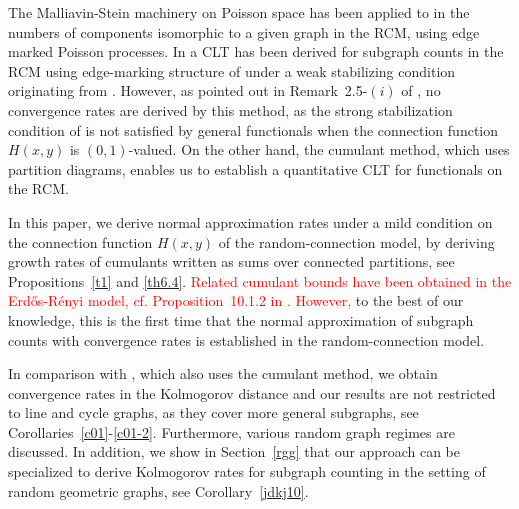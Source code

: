 \documentclass[12pt]{article}
\let\Horig\H
\numberwithin{equation}{section}
\begin{document}
   The Malliavin-Stein machinery on Poisson space \cite{lastpeccatipenrose} has been applied to in \cite{LNS21} the numbers of components isomorphic to a given graph in the RCM, using edge marked Poisson processes.
   In \cite{can2022} a CLT has been derived for subgraph counts in the RCM
   using edge-marking structure of \cite{LNS21} 
   under a weak stabilizing condition originating from \cite{penrose01}. 
   However, as pointed out in Remark~2.5-$(i)$ of \cite{can2022},
   no convergence rates are derived by this method, as 
   the strong stabilization condition of \cite{penrose05,lachiezerey4}
   is not satisfied by general functionals
   when the connection function $H(x,y)$ is $(0,1)$-valued. 
 On the other hand, the cumulant method, which uses partition diagrams, enables us to establish a quantitative CLT for functionals on the RCM. %

\medskip 

 In this paper, we derive normal approximation rates under a mild condition
 on the connection function $H(x,y)$ of the random-connection model,
 by deriving growth rates of cumulants written as sums over
 connected partitions, see Propositions~\ref{t1} and \ref{th6.4}.  \textcolor{red}{Related cumulant bounds have been obtained in the {E}rd{\Horig{o}}s-{R}\'enyi model, cf. Proposition~10.1.2 in \cite{feray}. However,} to the best of our knowledge, this is the first time that the normal approximation
 of subgraph counts with convergence rates is established
 in the random-connection model.
 
\medskip 

 In comparison with \cite{khorunzhiy}, which also uses the cumulant method, 
 we obtain convergence rates in the Kolmogorov distance and our results are 
 not restricted to line and cycle graphs, as they cover more general subgraphs,
 see Corollaries~\ref{c01}-\ref{c01-2}. 
 Furthermore, various random graph regimes are discussed.
 In addition,
   we show in Section~\ref{rgg} that our approach can be
   specialized to derive Kolmogorov rates for
   subgraph counting in the setting of random geometric graphs,
   see Corollary~\ref{jdkj10}. 
 
\end{document}
